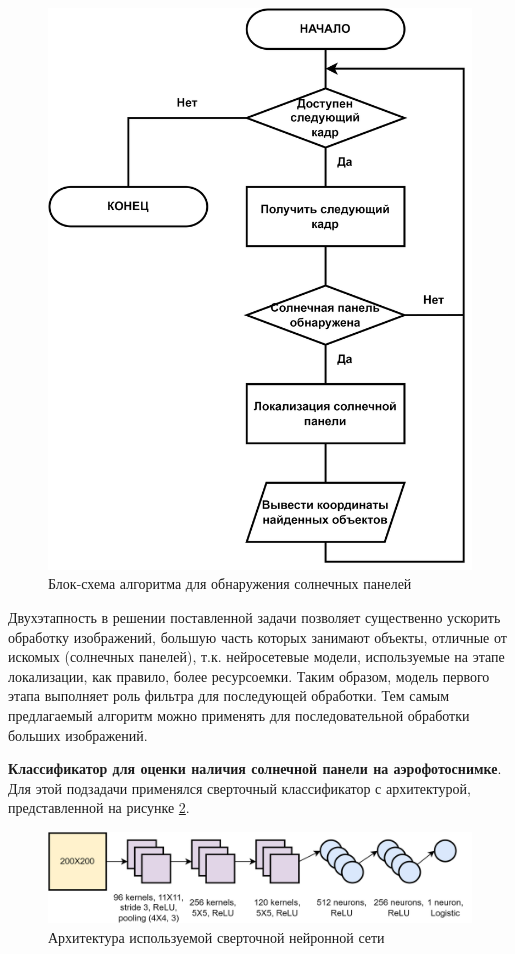 \begin{figure}[ht]
	\centering
	\includegraphics[width=12cm]{man-source/images/ch4/pic4-16a.png}
	\caption{Блок-схема алгоритма для обнаружения солнечных панелей}
	\label{fig:solar_system_arch}
\end{figure}

Двухэтапность в решении поставленной задачи позволяет существенно ускорить обработку изображений, большую часть которых занимают объекты, отличные от искомых (солнечных панелей), т.к. нейросетевые модели, используемые на этапе локализации, как правило, более ресурсоемки. Таким образом, модель первого этапа выполняет роль фильтра для последующей обработки. Тем самым предлагаемый алгоритм можно применять для последовательной обработки больших изображений.

\textbf{Классификатор для оценки наличия солнечной панели на аэрофотоснимке}. Для этой подзадачи применялся сверточный классификатор с архитектурой, представленной на рисунке \ref{fig:used_cnn}. 

\begin{figure}[ht]
	\centering
	\includegraphics[width=17cm]{man-source/images/ch4/pic4-19.png}
	\caption{Архитектура используемой сверточной нейронной сети}
	\label{fig:used_cnn}
\end{figure}

